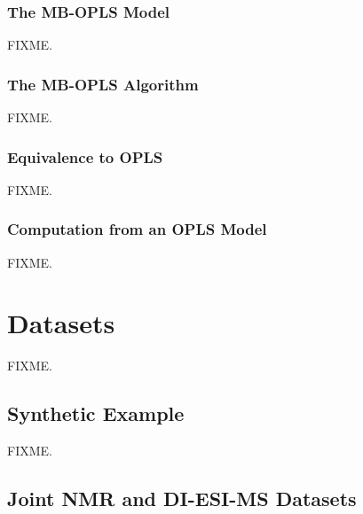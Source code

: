 \subsubsection{The MB-OPLS Model}

\begin{doublespace}
FIXME.
\end{doublespace}

\subsubsection{The MB-OPLS Algorithm}

\begin{doublespace}
FIXME.
\end{doublespace}

\subsubsection{Equivalence to OPLS}

\begin{doublespace}
FIXME.
\end{doublespace}

\subsubsection{Computation from an OPLS Model}

\begin{doublespace}
FIXME.
\end{doublespace}

\section{Datasets}

\begin{doublespace}
FIXME.
\end{doublespace}

\subsection{Synthetic Example}

\begin{doublespace}
FIXME.
\end{doublespace}

\subsection{Joint \hnmr{} NMR and DI-ESI-MS Datasets}

